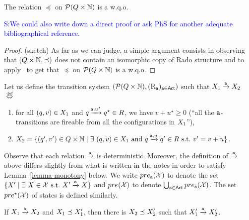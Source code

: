 \documentclass[envcountsame,a4paper,12pt]{llncs}
\renewcommand{\emptyset}{\varnothing}
\begin{document}
  \begin{lemma}\label{lemma-wqo}
    The relation $\preceq$ on ${\cal P}(Q \times \mathbb{N})$ is a w.q.o.
  \end{lemma}

  \textcolor{blue}{S:We could also write down a direct proof or ask PhS for another adequate bibliographical
    reference.}

  \begin{proof} (sketch) As far as we can judge, a simple argument consists in observing
    that $(Q \times \mathbb{N},\preceq)$ does not contain an isomorphic copy of
    Rado structure and to apply~\cite[Theorem 1]{Jancar99} to get that
    $\preceq$ on ${\cal P}(Q \times \mathbb{N})$ is a w.q.o.
  \end{proof}


  Let us define the transition system $({\cal P}(Q \times \mathbb{N}),(\operatorname{R}_{\mathtt{a}})_{\mathtt{a} \in {\rm \sf Act}})$
  such that $X_1 \xrightarrow{\!\!\mathtt{a}\!\!} X_2$ $\equivdef$
  \begin{enumerate}
  \item for all $(q,v) \in X_1$ and
    $q \xrightarrow{\!\!\mathtt{a},u^{\star}\!\!} q^{\star} \in R$, we have
    $v + u^{\star} \geq 0$ (``all the $\mathtt{a}$-transitions are fireable from all the configurations
    in $X_1$''),
  \item 
  $
  \aset_2 =
  \{
    \pair{\alocation'}{v'} \in \locations \times \Nat \mid
    \exists \ \pair{\alocation}{v} \in \aset_1 \
    \mbox{and}  \ 
    \alocation \step{\aaction,u} \alocation' \in R
    \ \mbox{s.t.} \ v' = v + u 
    \}$.
    \end{enumerate}
    Observe that each relation $\xrightarrow{\!\!\mathtt{a}\!\!}$ is deterministic.
    Moreover, the definition of $\xrightarrow{\!\!\mathtt{a}\!\!}$ above differs slightly from what is written
    in the notes in order to satisfy Lemma~\ref{lemma-monotony} below.
    We write $pre_{\mathtt{a}}(\mathcal{X})$ to denote
    the set $\set{\aset' \mid \exists \ \aset \in \mathcal{X} \ \mbox{s.t.} \ 
      \aset' \step{\aaction} \aset}$ and
    $pre_{}(\mathcal{X})$ to denote
    $\bigcup_{\mathtt{a} \in {\rm \sf Act}} pre_{\mathtt{a}}(\mathcal{X})$.
    The set $pre^{\star}(\mathcal{X})$ of states  is defined similarly.


    

  \begin{lemma}[Monotony]\label{lemma-monotony}
    If $X_1 \xrightarrow{\!\!\mathtt{a}\!\!} X_2$ and $X_1 \preceq X_1'$, then
    there is $X_2 \preceq X_2'$ such that $X_1' \xrightarrow{\!\!\mathtt{a}\!\!} X_2'$.
  \end{lemma}
\end{document}

